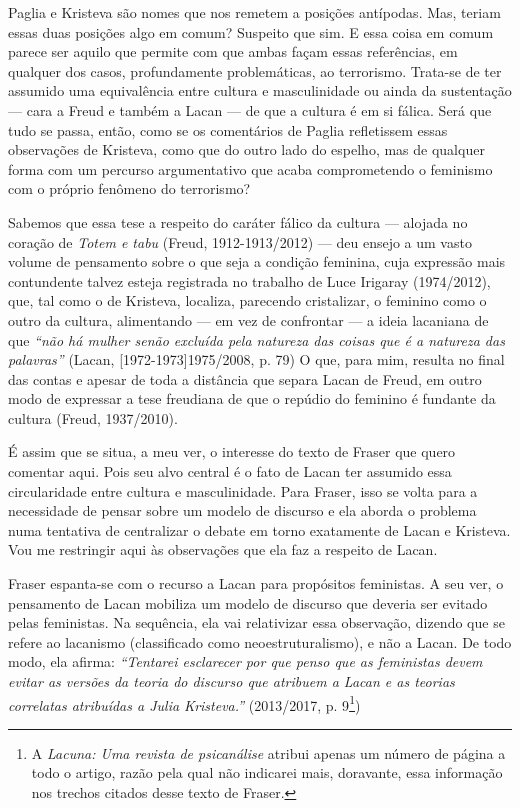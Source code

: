 Paglia e Kristeva são nomes que nos remetem a posições antípodas. Mas,
teriam essas duas posições algo em comum? Suspeito que sim. E essa coisa
em comum parece ser aquilo que permite com que ambas façam essas
referências, em qualquer dos casos, profundamente problemáticas, ao
terrorismo. Trata-se de ter assumido uma equivalência entre cultura e
masculinidade ou ainda da sustentação --- cara a Freud e também a Lacan
--- de que a cultura é em si fálica. Será que tudo se passa, então, como
se os comentários de Paglia refletissem essas observações de Kristeva,
como que do outro lado do espelho, mas de qualquer forma com um percurso
argumentativo que acaba comprometendo o feminismo com o próprio fenômeno
do terrorismo?

Sabemos que essa tese a respeito do caráter fálico da cultura --- alojada
no coração de \emph{Totem e tabu} (Freud, 1912-1913/2012) --- deu ensejo
a um vasto volume de pensamento sobre o que seja a condição feminina,
cuja expressão mais contundente talvez esteja registrada no trabalho de
Luce Irigaray (1974/2012), que, tal como o de Kristeva, localiza,
parecendo cristalizar, o feminino como o outro da cultura, alimentando
--- em vez de confrontar --- a ideia lacaniana de que \emph{``não há
mulher senão excluída pela natureza das coisas que é a natureza das
palavras''} (Lacan, {[}1972-1973{]}1975/2008, p. 79) O que, para mim,
resulta no final das contas e apesar de toda a distância que separa
Lacan de Freud, em outro modo de expressar a tese freudiana de que o
repúdio do feminino é fundante da cultura (Freud, 1937/2010).

É assim que se situa, a meu ver, o interesse do texto de Fraser que
quero comentar aqui. Pois seu alvo central é o fato de Lacan ter
assumido essa circularidade entre cultura e masculinidade. Para Fraser,
isso se volta para a necessidade de pensar sobre um modelo de discurso e
ela aborda o problema numa tentativa de centralizar o debate em torno
exatamente de Lacan e Kristeva. Vou me restringir aqui às observações
que ela faz a respeito de Lacan.

Fraser espanta-se com o recurso a Lacan para propósitos feministas. A
seu ver, o pensamento de Lacan mobiliza um modelo de discurso que
deveria ser evitado pelas feministas. Na sequência, ela vai relativizar
essa observação, dizendo que se refere ao lacanismo (classificado como
neoestruturalismo), e não a Lacan. De todo modo, ela afirma:
\emph{``Tentarei esclarecer por que penso que as feministas devem evitar
as versões da teoria do discurso que atribuem a Lacan e as teorias
correlatas atribuídas a Julia Kristeva.''} (2013/2017, p. 9\footnote{A
  \emph{Lacuna: Uma revista de psicanálise} atribui apenas um número de
  página a todo o artigo, razão pela qual não indicarei mais, doravante,
  essa informação nos trechos citados desse texto de Fraser.})

